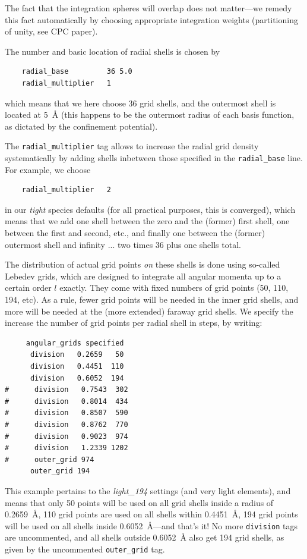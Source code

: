 The fact that the integration spheres will overlap does not matter---we remedy
this fact automatically by choosing appropriate integration weights
(partitioning of unity, see CPC paper).

The number and basic location of radial shells is chosen by
\begin{verbatim}
    radial_base         36 5.0
    radial_multiplier   1
\end{verbatim}
which means that we here choose 36 grid shells, and the outermost shell is
located at 5~{\AA} (this happens to be the outermost radius of each basis
function, as dictated by the confinement potential). 

The \texttt{radial\_multiplier} tag allows to increase the radial grid density
systematically by adding shells inbetween those specified in the
\texttt{radial\_base} line. For example, we choose 
\begin{verbatim}
    radial_multiplier   2
\end{verbatim}
in our \emph{tight} species defaults (for all practical purposes, this is
converged), which means that we add one shell between the zero and the
(former) first shell, one between the first and second, etc., and finally one
between the (former) outermost shell and infinity ... two times 36 plus one
shells total.

The distribution of actual grid points \emph{on} these shells is done using
so-called Lebedev grids, which are designed to integrate all angular
momenta up to a certain order $l$ exactly. They come with fixed numbers of grid
points (50, 110, 194, etc). As a rule, fewer grid points will be needed in the
inner grid shells, and more will be needed at the (more extended) faraway grid
shells. We specify the increase the number of grid points per radial shell in
steps, by writing:
\begin{verbatim}
     angular_grids specified
      division   0.2659   50
      division   0.4451  110
      division   0.6052  194
#      division   0.7543  302
#      division   0.8014  434
#      division   0.8507  590
#      division   0.8762  770
#      division   0.9023  974
#      division   1.2339 1202
#      outer_grid 974
      outer_grid 194
\end{verbatim}
This example pertains to the \emph{light\_194} settings (and very light
elements), and means that only 
50 points will be used on all grid shells inside a radius of 0.2659~{\AA}, 110
grid points are used on all shells within 0.4451~{\AA}, 194 grid points will
be used on all shells inside 0.6052~{\AA}---and that's it! No more
\texttt{division} tags are uncommented, and all shells outside 0.6052~{\AA}
also get 194 grid shells, as given by the uncommented \texttt{outer\_grid}
tag. 

